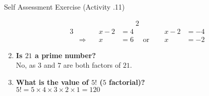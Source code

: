 \documentclass[../notes.tex]{subfiles}
\begin{document}
\begin{exercise}{Self Assessment Exercise (Activity \thechapter.11)}
\begin{enumerate}
\begin{alignat*}{2}
						\end{alignat*}
						\begin{alignat*}{3}
							& \qquad &x - 2 &= 4 \qquad &x - 2 &= -4\\
							& \Rightarrow \quad &x &= 6 \quad \text{ or } \quad &x &= -2 
						\end{alignat*}
					\item \textbf{Is $21$ a prime number?}\\
						No, as $3$ and $7$ are both factors of $21$.
					\item \textbf{What is the value of $5!$ ($5$ factorial)?}\\
						$5! = 5 \times 4 \times 3 \times 2 \times 1 = 120$
				\end{enumerate}
			\end{exercise}
\end{document}
